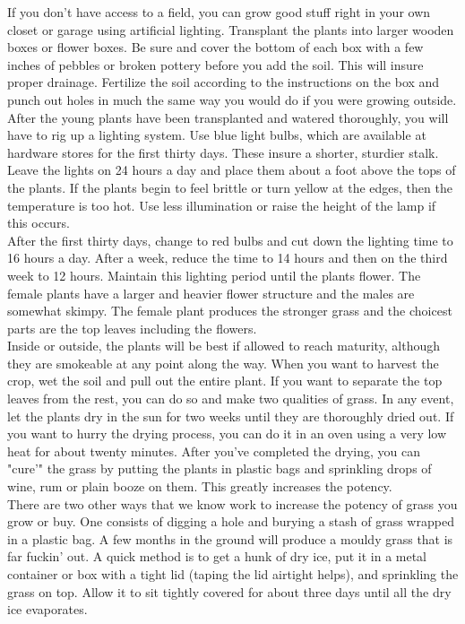 \documentclass[11pt,twoside,a4paper]{book}
\begin{document}
If you don't have access to a field, you can grow good stuff right in your own closet or garage using artificial lighting. Transplant the plants into larger wooden boxes or flower boxes. Be sure and cover the bottom of each box with a few inches of pebbles or broken pottery before you add the soil. This will insure proper drainage. Fertilize the soil according to the instructions on the box and punch out holes in much the same way you would do if you were growing outside. After the young plants have been transplanted and watered thoroughly, you will have to rig up a lighting system. Use blue light bulbs, which are available at hardware stores for the first thirty days. These insure a shorter, sturdier stalk. Leave the lights on 24 hours a day and place them about a foot above the tops of the plants. If the plants begin to feel brittle or turn yellow at the edges, then the temperature is too hot. Use less illumination or raise the height of the lamp if this occurs.~\\

After the first thirty days, change to red bulbs and cut down the lighting time to 16 hours a day. After a week, reduce the time to 14 hours and then on the third week to 12 hours. Maintain this lighting period until the plants flower. The female plants have a larger and heavier flower structure and the males are somewhat skimpy. The female plant produces the stronger grass and the choicest parts are the top leaves including the flowers.~\\

Inside or outside, the plants will be best if allowed to reach maturity, although they are smokeable at any point along the way. When you want to harvest the crop, wet the soil and pull out the entire plant. If you want to separate the top leaves from the rest, you can do so and make two qualities of grass. In any event, let the plants dry in the sun for two weeks until they are thoroughly dried out. If you want to hurry the drying process, you can do it in an oven using a very low heat for about twenty minutes. After you've completed the drying, you can "cure'" the grass by putting the plants in plastic bags and sprinkling drops of wine, rum or plain booze on them. This greatly increases the potency.~\\

There are two other ways that we know work to increase the potency of grass you grow or buy. One consists of digging a hole and burying a stash of grass wrapped in a plastic bag. A few months in the ground will produce a mouldy grass that is far fuckin' out. A quick method is to get a hunk of dry ice, put it in a metal container or box with a tight lid (taping the lid airtight helps), and sprinkling the grass on top. Allow it to sit tightly covered for about three days until all the dry ice evaporates.~\\
\end{document}
